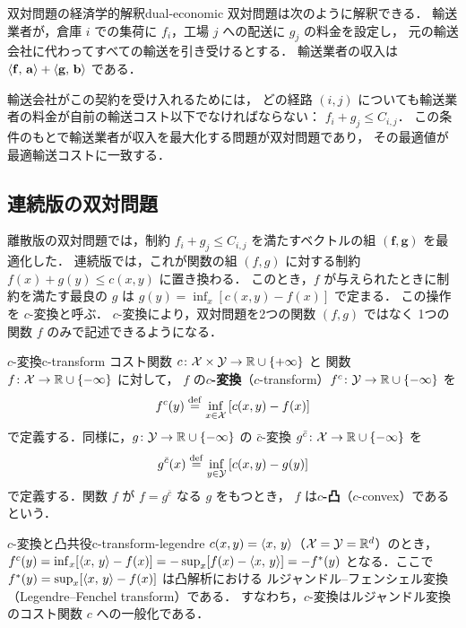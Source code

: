 \begin{remark}{双対問題の経済学的解釈}{dual-economic}
  双対問題は次のように解釈できる．
  輸送業者が，倉庫 $i$ での集荷に $f_i$，工場 $j$ への配送に $g_j$ の料金を設定し，
  元の輸送会社に代わってすべての輸送を引き受けるとする．
  輸送業者の収入は $\langle \mathbf{f},\, \mathbf{a} \rangle + \langle \mathbf{g},\, \mathbf{b} \rangle$ である．

  輸送会社がこの契約を受け入れるためには，
  どの経路 $(i, j)$ についても輸送業者の料金が自前の輸送コスト以下でなければならない：
  $f_i + g_j \leq C_{i,j}$．
  この条件のもとで輸送業者が収入を最大化する問題が双対問題であり，
  その最適値が最適輸送コストに一致する．
\end{remark}

\subsection{連続版の双対問題}
\label{subsec:continuous-dual}

離散版の双対問題では，制約 $f_i + g_j \leq C_{i,j}$ を満たすベクトルの組
$(\mathbf{f}, \mathbf{g})$ を最適化した．
連続版では，これが関数の組 $(f, g)$ に対する制約 $f(x) + g(y) \leq c(x, y)$ に置き換わる．
このとき，$f$ が与えられたときに制約を満たす最良の $g$ は
$g(y) = \inf_x [c(x, y) - f(x)]$ で定まる．
この操作を $c$-変換と呼ぶ．
$c$-変換により，双対問題を2つの関数 $(f, g)$ ではなく
1つの関数 $f$ のみで記述できるようになる．

\begin{definition}{$c$-変換}{c-transform}
  コスト関数 $c \colon \mathcal{X} \times \mathcal{Y} \to \mathbb{R} \cup \{+\infty\}$ と
  関数 $f \colon \mathcal{X} \to \mathbb{R} \cup \{-\infty\}$ に対して，
  $f$ の\textbf{$c$-変換}（$c$-transform）$f^c \colon \mathcal{Y} \to \mathbb{R} \cup \{-\infty\}$ を
  \[
    f^c(y) \overset{\mathrm{def}}{=} \inf_{x \in \mathcal{X}} \left[ c(x, y) - f(x) \right]
  \]
  で定義する．同様に，$g \colon \mathcal{Y} \to \mathbb{R} \cup \{-\infty\}$ の
  $\bar{c}$-変換 $g^{\bar{c}} \colon \mathcal{X} \to \mathbb{R} \cup \{-\infty\}$ を
  \[
    g^{\bar{c}}(x) \overset{\mathrm{def}}{=} \inf_{y \in \mathcal{Y}} \left[ c(x, y) - g(y) \right]
  \]
  で定義する．関数 $f$ が $f = g^{\bar{c}}$ なる $g$ をもつとき，
  $f$ は\textbf{$c$-凸}（$c$-convex）であるという．
\end{definition}

\begin{remark}{$c$-変換と凸共役}{c-transform-legendre}
  $c(x, y) = \langle x,\, y \rangle$（$\mathcal{X} = \mathcal{Y} = \mathbb{R}^d$）のとき，
  $f^c(y) = \inf_x [\langle x,\, y \rangle - f(x)]= -\sup_x [f(x) - \langle x,\, y \rangle] = -f^*(y)$
  となる．ここで $f^*(y) = \sup_x [\langle x,\, y \rangle - f(x)]$ は凸解析における
  ルジャンドル--フェンシェル変換（Legendre--Fenchel transform）である．
  すなわち，$c$-変換はルジャンドル変換のコスト関数 $c$ への一般化である．
\end{remark}

